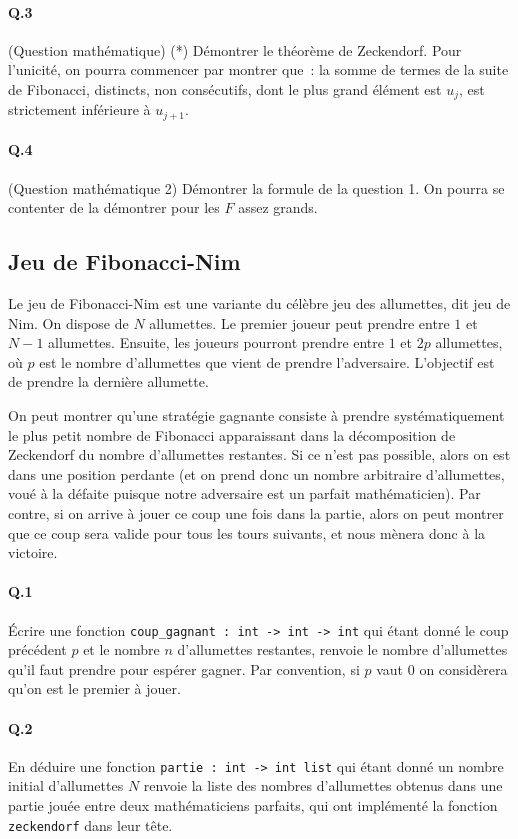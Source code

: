 \documentclass[10pt,a4paper]{article}
\begin{document}
\paragraph{Q.3} (Question mathématique) (*) Démontrer le théorème de Zeckendorf. Pour l'unicité, on pourra commencer par montrer que~: la somme de termes de la suite de Fibonacci, distincts, non consécutifs, dont le plus grand élément est $u_j$, est strictement inférieure à $u_{j+1}$.

\paragraph{Q.4} (Question mathématique 2) Démontrer la formule de la question 1. On pourra se contenter de la démontrer pour les $F$ assez grands.

\subsection{Jeu de Fibonacci-Nim}
Le jeu de Fibonacci-Nim est une variante du célèbre jeu des allumettes, dit jeu de Nim. On dispose de $N$ allumettes. Le premier joueur peut prendre entre $1$ et $N-1$ allumettes. Ensuite, les joueurs pourront prendre entre $1$ et $2p$ allumettes, où $p$ est le nombre d'allumettes que vient de prendre l'adversaire. L'objectif est de prendre la dernière allumette.

On peut montrer qu'une stratégie gagnante consiste à prendre systématiquement le plus petit nombre de Fibonacci apparaissant dans la décomposition de Zeckendorf du nombre d'allumettes restantes. Si ce n'est pas possible, alors on est dans une position perdante (et on prend donc un nombre arbitraire d'allumettes, voué à la défaite puisque notre adversaire est un parfait mathématicien). Par contre, si on arrive à jouer ce coup une fois dans la partie, alors on peut montrer que ce coup sera valide pour tous les tours suivants, et nous mènera donc à la victoire.
\paragraph{Q.1} Écrire une fonction \texttt{coup\_gagnant : int -> int -> int} qui étant donné le coup précédent $p$ et le nombre $n$ d'allumettes restantes, renvoie le nombre d'allumettes qu'il faut prendre pour espérer gagner. Par convention, si $p$ vaut $0$ on considèrera qu'on est le premier à jouer.
\paragraph{Q.2} En déduire une fonction \texttt{partie : int -> int list} qui étant donné un nombre initial d'allumettes $N$ renvoie la liste des nombres d'allumettes obtenus dans une partie jouée entre deux mathématiciens parfaits, qui ont implémenté la fonction \texttt{zeckendorf} dans leur tête.
\end{document}

